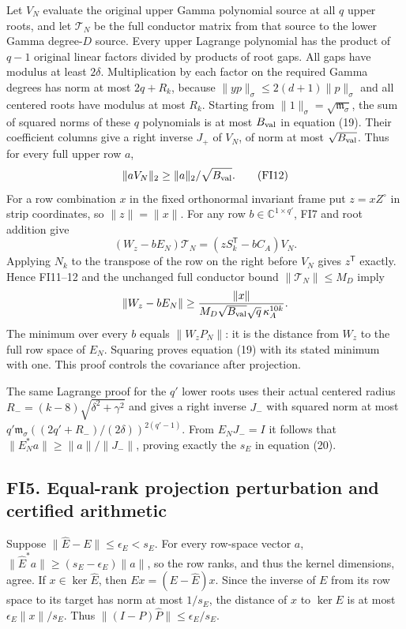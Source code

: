 \documentclass[11pt]{article}
\begin{document}
Let \(V_N\) evaluate the original upper Gamma polynomial source at all \(q\) upper roots, and let \(\mathcal T_N\) be the full conductor matrix from that source to the lower Gamma degree-\(D\) source. Every upper Lagrange polynomial has the product of \(q-1\) original linear factors divided by products of root gaps. All gaps have modulus at least \(2\delta\). Multiplication by each factor on the required Gamma degrees has norm at most \(2q+R_k\), because \(\|yp\|_\sigma\le2(d+1)\|p\|_\sigma\) and all centered roots have modulus at most \(R_k\). Starting from \(\|1\|_\sigma=\sqrt{\mathfrak m_\sigma}\), the sum of squared norms of these \(q\) polynomials is at most \(B_{\rm val}\) in equation (19). Their coefficient columns give a right inverse \(J_+\) of \(V_N\), of norm at most \(\sqrt{B_{\rm val}}\). Thus for every full upper row \(a\), \[
 \|aV_N\|_2\ge\|a\|_2/\sqrt{B_{\rm val}}.
 \tag{FI12}
\] For a row combination \(x\) in the fixed orthonormal invariant frame put \(z=xZ^\circ\) in strip coordinates, so \(\|z\|=\|x\|\). For any row \(b\in\mathbb C^{1\times q'}\), FI7 and root addition give \[
 (W_z-bE_N)\mathcal T_N=(zS_k^{\mathsf T}-bC_A)V_N.
\] Applying \(N_k\) to the transpose of the row on the right before \(V_N\) gives \(z^{\mathsf T}\) exactly. Hence FI11--12 and the unchanged full conductor bound \(\|\mathcal T_N\|\le M_D\) imply \[
 \|W_z-bE_N\|\ge\frac{\|x\|}{M_D\sqrt{B_{\rm val}}\sqrt q\,\kappa_A^{10k}}.
\] The minimum over every \(b\) equals \(\|W_zP_N\|\): it is the distance from \(W_z\) to the full row space of \(E_N\). Squaring proves equation (19) with its stated minimum with one. This proof controls the covariance after projection.

The same Lagrange proof for the \(q'\) lower roots uses their actual centered radius \(R_-=(k-8)\sqrt{\delta^2+\gamma^2}\) and gives a right inverse \(J_-\) with squared norm at most \(q'\mathfrak m_\sigma((2q'+R_-)/(2\delta))^{2(q'-1)}\). From \(E_NJ_-=I\) it follows that \(\|E_N^*a\|\ge\|a\|/\|J_-\|\), proving exactly the \(s_E\) in equation (20).

\subsection{FI5. Equal-rank projection perturbation and certified arithmetic}\label{fi5.-equal-rank-projection-perturbation-and-certified-arithmetic}

Suppose \(\|\widehat E-E\|\le\epsilon_E<s_E\). For every row-space vector \(a\), \(\|\widehat E^*a\|\ge(s_E-\epsilon_E)\|a\|\), so the row ranks, and thus the kernel dimensions, agree. If \(x\in\ker\widehat E\), then \(Ex=(E-\widehat E)x\). Since the inverse of \(E\) from its row space to its target has norm at most \(1/s_E\), the distance of \(x\) to \(\ker E\) is at most \(\epsilon_E\|x\|/s_E\). Thus \(\|(I-P)\widehat P\|\le\epsilon_E/s_E\).
\end{document}
